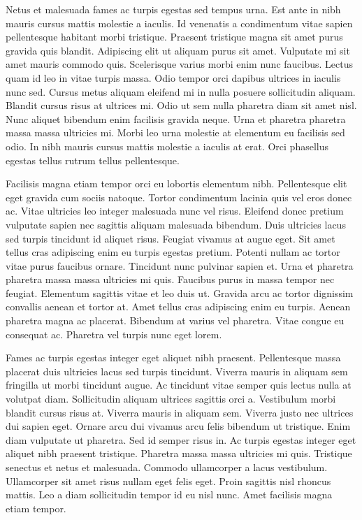 Netus et malesuada fames ac turpis egestas sed tempus urna. Est ante 
in nibh mauris cursus mattis molestie a iaculis. Id venenatis a 
condimentum vitae sapien pellentesque habitant morbi tristique. Praesent
 tristique magna sit amet purus gravida quis blandit. Adipiscing elit ut
 aliquam purus sit amet. Vulputate mi sit amet mauris commodo quis. 
Scelerisque varius morbi enim nunc faucibus. Lectus quam id leo in vitae
 turpis massa. Odio tempor orci dapibus ultrices in iaculis nunc sed. 
Cursus metus aliquam eleifend mi in nulla posuere sollicitudin aliquam. 
Blandit cursus risus at ultrices mi. Odio ut sem nulla pharetra diam sit
 amet nisl. Nunc aliquet bibendum enim facilisis gravida neque. Urna et 
pharetra pharetra massa massa ultricies mi. Morbi leo urna molestie at 
elementum eu facilisis sed odio. In nibh mauris cursus mattis molestie a
 iaculis at erat. Orci phasellus egestas tellus rutrum tellus 
pellentesque.


Facilisis magna etiam tempor orci eu lobortis elementum nibh. 
Pellentesque elit eget gravida cum sociis natoque. Tortor condimentum 
lacinia quis vel eros donec ac. Vitae ultricies leo integer malesuada 
nunc vel risus. Eleifend donec pretium vulputate sapien nec sagittis 
aliquam malesuada bibendum. Duis ultricies lacus sed turpis tincidunt id
 aliquet risus. Feugiat vivamus at augue eget. Sit amet tellus cras 
adipiscing enim eu turpis egestas pretium. Potenti nullam ac tortor 
vitae purus faucibus ornare. Tincidunt nunc pulvinar sapien et. Urna et 
pharetra pharetra massa massa ultricies mi quis. Faucibus purus in massa
 tempor nec feugiat. Elementum sagittis vitae et leo duis ut. Gravida 
arcu ac tortor dignissim convallis aenean et tortor at. Amet tellus cras
 adipiscing enim eu turpis. Aenean pharetra magna ac placerat. Bibendum 
at varius vel pharetra. Vitae congue eu consequat ac. Pharetra vel 
turpis nunc eget lorem.


Fames ac turpis egestas integer eget aliquet nibh praesent. 
Pellentesque massa placerat duis ultricies lacus sed turpis tincidunt. 
Viverra mauris in aliquam sem fringilla ut morbi tincidunt augue. Ac 
tincidunt vitae semper quis lectus nulla at volutpat diam. Sollicitudin 
aliquam ultrices sagittis orci a. Vestibulum morbi blandit cursus risus 
at. Viverra mauris in aliquam sem. Viverra justo nec ultrices dui sapien
 eget. Ornare arcu dui vivamus arcu felis bibendum ut tristique. Enim 
diam vulputate ut pharetra. Sed id semper risus in. Ac turpis egestas 
integer eget aliquet nibh praesent tristique. Pharetra massa massa 
ultricies mi quis. Tristique senectus et netus et malesuada. Commodo 
ullamcorper a lacus vestibulum. Ullamcorper sit amet risus nullam eget 
felis eget. Proin sagittis nisl rhoncus mattis. Leo a diam sollicitudin 
tempor id eu nisl nunc. Amet facilisis magna etiam tempor.



